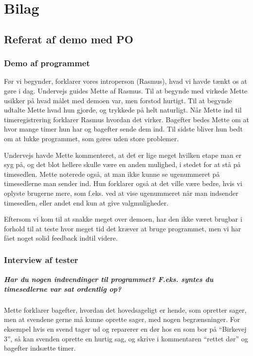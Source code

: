 
\newpage
\section{Bilag}
\subsection{Referat af demo med PO}\label{demoreferat}
\subsubsection{Demo af programmet}
Før vi begynder, forklarer vores introperson (Rasmus), hvad vi havde tænkt os at gøre i dag.
Undervejs guides Mette af Rasmus.
Til at begynde med virkede Mette usikker på hvad målet med demoen var, men forstod hurtigt.
Til at begynde udtalte Mette hvad hun gjorde, og trykkede på helt naturligt.
Når Mette ind til timeregistrering forklarer Rasmus hvordan det virker. 
Bagefter bedes Mette om at hvor mange timer hun har og bagefter sende dem ind.
Til sidste bliver hun bedt om at lukke programmet, som gøres uden store problemer.

Undervejs havde Mette kommenteret, at det er lige meget hvilken etape man er syg på, og det blot hellere skulle være en anden mulighed, i stedet for at stå på timesedlen.
Mette noterede også, at man ikke kunne se ugenummeret på timesedlerne man sender ind.
Hun forklarer også at det ville være bedre, hvis vi oplyste brugerne mere, som f.eks. ved at vise ugenummeret når man indsender timesedlen, eller andet end kun at give valgmuligheder.

Eftersom vi kom til at snakke meget over demoen, har den ikke været brugbar i forhold til at teste hvor meget tid det kræver at bruge programmet, men vi har fået noget solid feedback indtil videre.

\subsubsection{Interview af tester}
\subparagraph{Har du nogen indvendinger til programmet? F.eks. syntes du timesedlerne var sat ordentlig op?}

Mette forklarer bagefter, hvordan det hovedsageligt er hende, som opretter sager, men at svendene gerne må kunne oprette sager, med nogen begrænsninger.
For eksempel hvis en svend tager ud og reparerer en dør hos en som bor på “Birkevej 3”, så kan svenden oprette en hurtig sag, og skrive i kommentaren “rettet dør” og bagefter indsætte timer.

